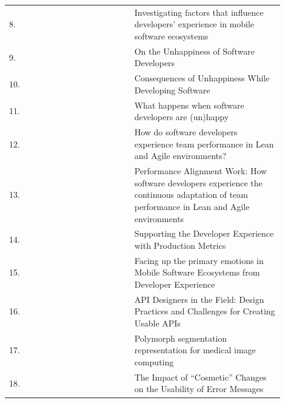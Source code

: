 \documentclass[english, 12pt, a4paper, sci, utf8, a-1b, online]{aaltothesis}
\begin{document}
\begin{center}
\begin{longtable}{p{0.05\linewidth}p{0.35\linewidth}p{0.5\linewidth}}
    8.  & \textcite{fontao2017investigating}                    & Investigating factors that influence developers' experience in mobile software ecosystems                                                   \\
    9.  & \textcite{on-the-unhappiness}                         & On the Unhappiness of Software Developers                                                                                                   \\
    10. & \textcite{consequences-of-unhappiness}                & Consequences of Unhappiness While Developing Software                                                                                       \\
    11. & \textcite{what-happens-when-unhappy}                  & What happens when software developers are (un)happy                                                                                         \\
    12. & \textcite{how-developers-experience-team-performance} & How do software developers experience team performance in Lean and Agile environments?                                                      \\
    13. & \textcite{paw}                                        & Performance Alignment Work: How software developers experience the continuous adaptation of team performance in Lean and Agile environments \\
    14. & \textcite{chatley2019supporting}                      & Supporting the Developer Experience with Production Metrics                                                                                 \\
    15. & \textcite{fontao2017facing}                           & Facing up the primary emotions in Mobile Software Ecosystems from Developer Experience                                                      \\
    16. & \textcite{api-designers}                              & API Designers in the Field: Design Practices and Challenges for Creating Usable APIs                                                        \\
    17. & \textcite{pinter2019polymorph}                        & Polymorph segmentation representation for medical image computing                                                                           \\
    18. & \textcite{dong2019impact}                             & The Impact of ``Cosmetic'' Changes on the Usability of Error Messages                                                                       \\

\end{longtable}
\end{center}
\end{document}
